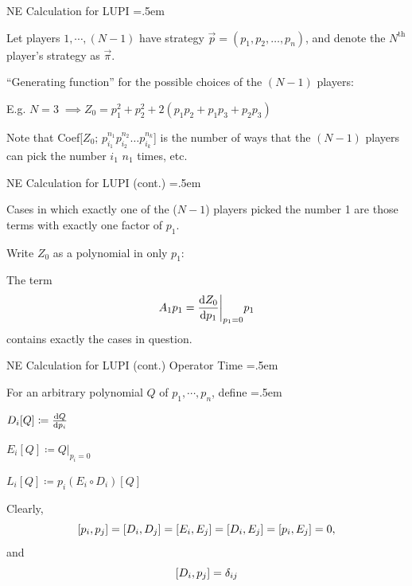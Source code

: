 \documentclass[xcolor={dvipsnames}]{beamer}
\let\olditemize=\itemize
\let\endolditemize=\enditemize
\renewenvironment{itemize}{\olditemize \itemsep=.5em }{\endolditemize}
\begin{document}
\begin{frame}{NE Calculation for LUPI}
\begin{itemize}
    \item<1-> Let players $1,\cdots,(N-1)$ have strategy $\vec{p} = (p_1, p_2, \dots, p_n)$, and denote the $N^\text{th}$ player's strategy as $\vec{\pi}$.
    \item<2-> ``Generating function'' for the possible choices of the $(N-1)$ players:
    \item<4-> E.g. $N=3\; \implies Z_0 = p_1^2 + p_2^2 + 2(p_1p_2 + p_1p_3 + p_2p_3)$
    \item<5-> Note that Coef[$Z_0$; $p_{i_1}^{n_1}p_{i_2}^{n_2}\dots p_{i_k}^{n_k}$] is the number of ways that the $(N-1)$ players can pick the number $i_1$ $n_1$ times, etc. 
\end{itemize}
\end{frame}

\begin{frame}{NE Calculation for LUPI (cont.)}
\begin{itemize}
    \item<1-> Cases in which exactly one of the ($N-1$) players picked the number 1 are those terms with exactly one factor of $p_1$.
    \item<2-> Write $Z_0$ as a polynomial in only $p_1$:
    \item<4-> The term
    \[ A_1p_1 = \dv{Z_0}{p_1}\bigg\rvert_{p_1=0}p_1 \]
    contains exactly the cases in question.
\end{itemize}
\end{frame}

\begin{frame}{NE Calculation for LUPI (cont.)}
\alert{Operator Time}
\begin{itemize}
    \item<1-> For an arbitrary polynomial $Q$ of $p_1,\cdots,p_n$, define
    \begin{itemize}
        \item<2-> $D_i[Q] \coloneqq \dv{Q}{p_i}$
        \item<3-> $E_i[Q] \coloneqq Q\big\rvert_{p_i=0}$ 
        \item<4-> $L_i[Q] \coloneqq p_i(E_i\circ D_i)[Q]$
    \end{itemize}
    \item<5-> Clearly,
    \[ \comm{p_i}{p_j} = \comm{D_i}{D_j} = \comm{E_i}{E_j} = \comm{D_i}{E_j} = \comm{p_i}{E_j} = 0, \]
    and 
    \[ \comm{D_i}{p_j} = \delta_{ij} \]
\end{itemize}
\end{frame}
\end{document}
